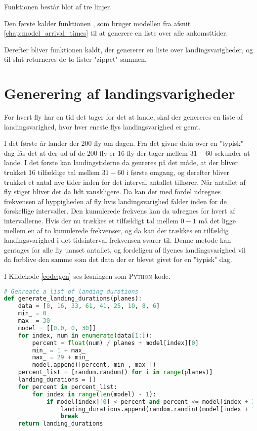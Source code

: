 Funktionen  består blot af tre linjer.

Den første kalder funktionen , som bruger modellen fra afsnit \ref{chap:model_arrival_times} til at generere en liste over alle ankomsttider.

Derefter bliver funktionen  kaldt, der genererer en liste over landingsvarigheder, og til slut returneres de to lister "zippet" sammen.

\section{Generering af landingsvarigheder}
For hvert fly har en tid det tager for det at lande, skal der genereres en liste af landingsvarighed, hvor hver eneste flys landingsvarighed er gemt.

I det første år lander der 200 fly om dagen. Fra det givne data over en "typisk" dag fås det at der ud af de 200 fly er 16 fly der tager mellem $31 - 60$ sekunder at lande.
I det første kan landingstiderne da genreres på det måde, at der bliver trukket 16 tilfældige tal mellem $31 - 60$ i første omgang, og derefter bliver trukket et antal nye tider inden for det interval antallet tilhører.
Når antallet af fly stiger bliver det da lidt vanskligere.
Da kan der med fordel udregnes frekvensen af hyppigheden af fly hvis landingsvarighed falder inden for de forskellige intervaller.
Den kumulerede frekvens kan da udregnes for hvert af intervallerne.
Hvis der nu trækkes et tilfældigt tal mellem $0-1$ må det ligge mellem en af to kumulerede frekvenser, og da kan der trækkes en tilfældig landingsvarighed i det tidsinterval frekvensen svarer til.
Denne metode kan gentages for alle fly uanset antallet, og fordeligen af flyenes landingsvarighed vil da forblive den samme som det data der er blevet givet for en "typisk" dag. 

I Kildekode \ref{code:gen} ses løsningen som \textsc{Python}-kode.

\begin{lstlisting}[language=Python, caption={generate\_landing\_durations-funktionen i airplanes.py}, label=code:gen]
# Genreate a list of landing durations
def generate_landing_durations(planes):
    data = [0, 16, 33, 61, 41, 25, 10, 8, 6]
    min_ = 0
    max_ = 30
    model = [[0.0, 0, 30]]
    for index, num in enumerate(data[1:]):
        percent = float(num) / planes + model[index][0]
        min_ = 1 + max_
        max_ = 29 + min_
        model.append([percent, min_, max_])
    percent_list = [random.random() for i in range(planes)]
    landing_durations = []
    for percent in percent_list:
        for index in range(len(model) - 1):
            if model[index][0] < percent and percent <= model[index + 1][0]:
                landing_durations.append(random.randint(model[index + 1][1], model[index + 1][2]))
                break
    return landing_durations
\end{lstlisting}

